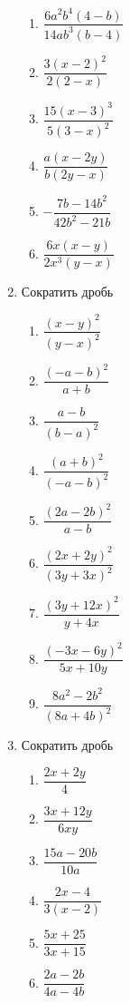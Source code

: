\documentclass[10pt, a4paper]{article}
\begin{document}
\begin{enumerate}
\begin{multicols}{3}
\begin{enumerate}
			\item $\dfrac{6a^2b^4(4-b)}{14ab^3(b-4)}$ 
			\item $\dfrac{3(x-2)^2}{2(2-x)}$ 
			\item $\dfrac{15(x-3)^3}{5(3-x)^2}$ 
			\item $\dfrac{a(x-2y)}{b(2y-x)}$ 
			\item $-\dfrac{7b-14b^2}{42b^2-21b}$ 
			\item $\dfrac{6x(x-y)}{2x^3(y-x)}$ 
		\end{enumerate}	
	\end{multicols}
	\item Сократить дробь
	\begin{multicols}{3}
		\begin{enumerate}
			\item $\dfrac{(x-y)^2}{(y-x)^2}$ 
			\item $\dfrac{(-a-b)^2}{a+b}$ 
			\item $\dfrac{a-b}{(b-a)^2}$ 
			\item $\dfrac{(a+b)^2}{(-a-b)^2}$ 
			\item $\dfrac{(2a-2b)^2}{a-b}$ 
			\item $\dfrac{(2x+2y)^2}{(3y+3x)^2}$ 
			\item $\dfrac{(3y+12x)^2}{y+4x}$ 
			\item $\dfrac{(-3x-6y)^2}{5x+10y}$ 
			\item $\dfrac{8a^2-2b^2}{(8a+4b)^2}$ 
		\end{enumerate}	
	\end{multicols}
	\item Сократить дробь
	\begin{multicols}{4}
		\begin{enumerate}
			\item $\dfrac{2x+2y}{4}$ 
			\item $\dfrac{3x+12y}{6xy}$ 
			\item $\dfrac{15a-20b}{10a}$ 
			\item $\dfrac{2x-4}{3(x-2)}$ 
			\item $\dfrac{5x+25}{3x+15}$ 
			\item $\dfrac{2a-2b}{4a-4b}$ 

\end{enumerate}
\end{multicols}
\end{enumerate}
\end{document}
